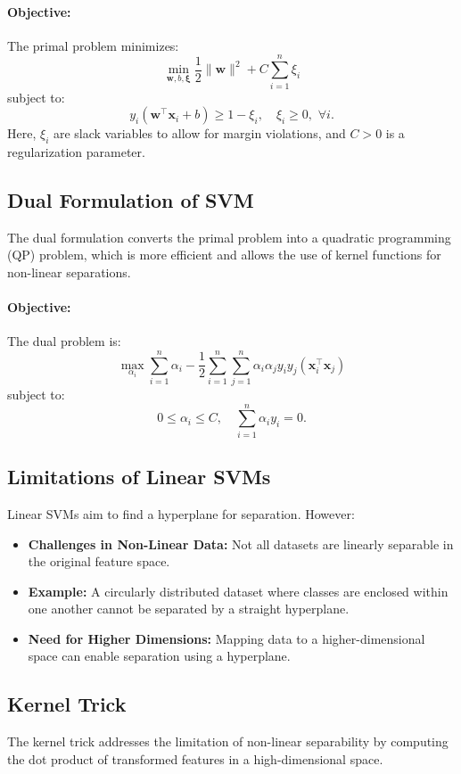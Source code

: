 \documentclass[12pt,a4paper]{article}
\begin{document}
\paragraph{Objective:}
The primal problem minimizes:
\[
\min_{\mathbf{w}, b, \bm{\xi}} \frac{1}{2}\|\mathbf{w}\|^2 + C \sum_{i=1}^n \xi_i
\]
subject to:
\[
y_i (\mathbf{w}^\top \mathbf{x}_i + b) \geq 1 - \xi_i, \quad \xi_i \geq 0, \,\, \forall i.
\]
Here, $\xi_i$ are slack variables to allow for margin violations, and $C > 0$ is a regularization parameter.

\subsection{Dual Formulation of SVM}
The dual formulation converts the primal problem into a quadratic programming (QP) problem, which is more efficient and allows the use of kernel functions for non-linear separations.

\paragraph{Objective:}
The dual problem is:
\[
\max_{\alpha_i} \sum_{i=1}^n \alpha_i - \frac{1}{2} \sum_{i=1}^n \sum_{j=1}^n \alpha_i \alpha_j y_i y_j (\mathbf{x}_i^\top \mathbf{x}_j)
\]
subject to:
\[
0 \leq \alpha_i \leq C, \quad \sum_{i=1}^n \alpha_i y_i = 0.
\]

\subsection{Limitations of Linear SVMs}
Linear SVMs aim to find a hyperplane for separation. However:
\begin{itemize}
    \item \textbf{Challenges in Non-Linear Data:} Not all datasets are linearly separable in the original feature space.
    \item \textbf{Example:} A circularly distributed dataset where classes are enclosed within one another cannot be separated by a straight hyperplane.
    \item \textbf{Need for Higher Dimensions:} Mapping data to a higher-dimensional space can enable separation using a hyperplane.
\end{itemize}

\subsection{Kernel Trick}
The kernel trick addresses the limitation of non-linear separability by computing the dot product of transformed features in a high-dimensional space.
\end{document}
